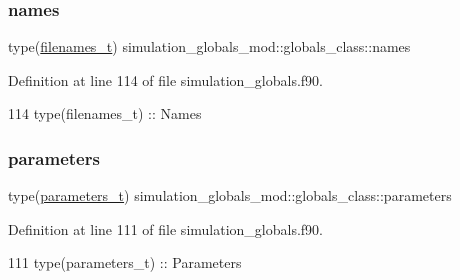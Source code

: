 \subsubsection{\texorpdfstring{names}{names}}
{\footnotesize\ttfamily type(\mbox{\hyperlink{structsimulation__globals__mod_1_1filenames__t}{filenames\+\_\+t}}) simulation\+\_\+globals\+\_\+mod\+::globals\+\_\+class\+::names\hspace{0.3cm}{\ttfamily [private]}}



Definition at line 114 of file simulation\+\_\+globals.\+f90.


\begin{DoxyCode}
114         \textcolor{keywordtype}{type}(filenames\_t)   :: Names
\end{DoxyCode}
\mbox{\label{structsimulation__globals__mod_1_1globals__class_aef60024afa0a128d0af3d8a47a732657}} 
\subsubsection{\texorpdfstring{parameters}{parameters}}
{\footnotesize\ttfamily type(\mbox{\hyperlink{structsimulation__globals__mod_1_1parameters__t}{parameters\+\_\+t}}) simulation\+\_\+globals\+\_\+mod\+::globals\+\_\+class\+::parameters\hspace{0.3cm}{\ttfamily [private]}}



Definition at line 111 of file simulation\+\_\+globals.\+f90.


\begin{DoxyCode}
111         \textcolor{keywordtype}{type}(parameters\_t)  :: Parameters
\end{DoxyCode}
\mbox{\label{structsimulation__globals__mod_1_1globals__class_a2bfeb5f54761daaffc19187307405940}} 
